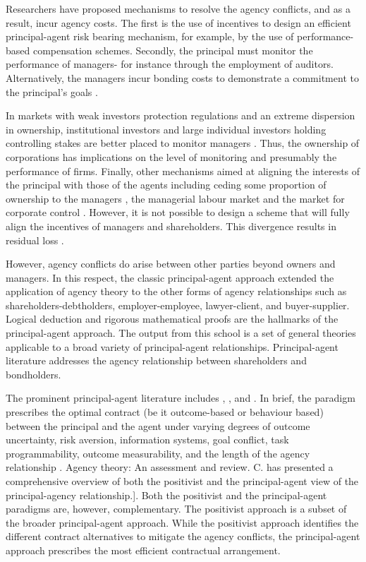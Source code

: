 \documentclass[a4paper,nobind]{templates/ociamthesis}
\begin{document}
Researchers have proposed mechanisms to resolve the agency conflicts, and as a result, incur agency costs. The first is the use of incentives to design an efficient principal-agent risk bearing mechanism, for example, by the use of performance-based compensation schemes. Secondly, the principal must monitor the performance of managers- for instance through the employment of auditors. Alternatively, the managers incur bonding costs to demonstrate a commitment to the principal's goals \autocite{bosse2016agency}.

In markets with weak investors protection regulations and an extreme dispersion in ownership, institutional investors and large individual investors holding controlling stakes are better placed to monitor managers \autocite{goergen2003levels}. Thus, the ownership of corporations has implications on the level of monitoring and presumably the performance of firms. Finally, other mechanisms aimed at aligning the interests of the principal with those of the agents including ceding some proportion of ownership to the managers \autocite{ang2000agency}, the managerial labour market and the market for corporate control \autocite{ballwieser2012agency}. However, it is not possible to design a scheme that will fully align the incentives of managers and shareholders. This divergence results in residual loss \autocite{fama1983agency}.

However, agency conflicts do arise between other parties beyond owners and managers. In this respect, the classic principal-agent approach extended the application of agency theory to the other forms of agency relationships such as shareholders-debtholders, employer-employee, lawyer-client, and buyer-supplier. Logical deduction and rigorous mathematical proofs are the hallmarks of the principal-agent approach. The output from this school is a set of general theories applicable to a broad variety of principal-agent relationships. Principal-agent literature addresses the agency relationship between shareholders and bondholders.

The prominent principal-agent literature includes \textcite{demski1978economic}, \textcite{eisenhardt1985control}, and \textcite{eisenhardt1988agency}. In brief, the paradigm prescribes the optimal contract (be it outcome-based or behaviour based) between the principal and the agent under varying degrees of outcome uncertainty, risk aversion, information systems, goal conflict, task programmability, outcome measurability, and the length of the agency relationship \autocite{eisenhardt1989agency}. Agency theory: An assessment and review. C. has presented a comprehensive overview of both the positivist and the principal-agent view of the principal-agency relationship.{]}. Both the positivist and the principal-agent paradigms are, however, complementary. The positivist approach is a subset of the broader principal-agent approach. While the positivist approach identifies the different contract alternatives to mitigate the agency conflicts, the principal-agent approach prescribes the most efficient contractual arrangement.
\end{document}
